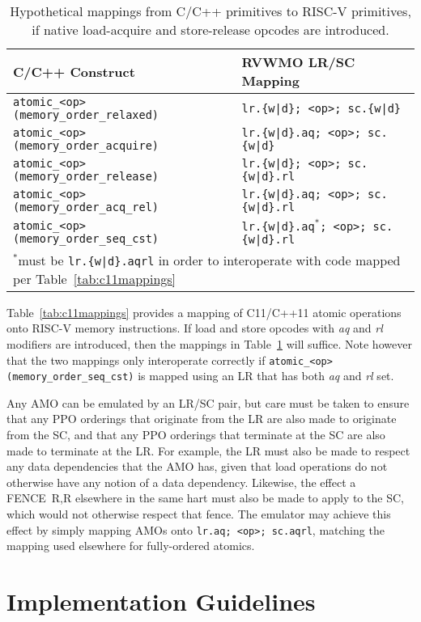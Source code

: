 \begin{table}[h!]
\begin{tabular}{|l|l|}
    \hline
    C/C++ Construct                           & RVWMO LR/SC Mapping\\
    \hline
    \tt atomic\_<op>(memory\_order\_relaxed)  & \tt lr.\{w|d\}; <op>; sc.\{w|d\} \\
    \hline
    \tt atomic\_<op>(memory\_order\_acquire)  & \tt lr.\{w|d\}.aq; <op>; sc.\{w|d\} \\
    \hline
    \tt atomic\_<op>(memory\_order\_release)  & \tt lr.\{w|d\}; <op>; sc.\{w|d\}.rl \\
    \hline
    \tt atomic\_<op>(memory\_order\_acq\_rel) & \tt lr.\{w|d\}.aq; <op>; sc.\{w|d\}.rl \\
    \hline
    \tt atomic\_<op>(memory\_order\_seq\_cst) & \tt lr.\{w|d\}.aq$^*$; <op>; sc.\{w|d\}.rl \\
    \hline
    \multicolumn{2}{l}{$^*$must be {\tt lr.\{w|d\}.aqrl} in order to interoperate with code mapped per Table~\ref{tab:c11mappings}}
  \end{tabular}
  \caption{Hypothetical mappings from C/C++ primitives to RISC-V primitives, if native load-acquire and store-release opcodes are introduced.}
  \label{tab:c11mappings_hypothetical}
\end{table}

Table~\ref{tab:c11mappings} provides a mapping of C11/C++11 atomic operations onto RISC-V memory instructions.
If load and store opcodes with {\em aq} and {\em rl} modifiers are introduced, then the mappings in Table~\ref{tab:c11mappings_hypothetical} will suffice.
Note however that the two mappings only interoperate correctly if {\tt atomic\_<op>(memory\_order\_seq\_cst)} is mapped using an LR that has both {\em aq} and {\em rl} set.

Any AMO can be emulated by an LR/SC pair, but care must be taken to ensure that any PPO orderings that originate from the LR are also made to originate from the SC, and that any PPO orderings that terminate at the SC are also made to terminate at the LR.
For example, the LR must also be made to respect any data dependencies that the AMO has, given that load operations do not otherwise have any notion of a data dependency.
Likewise, the effect a FENCE~R,R elsewhere in the same hart must also be made to apply to the SC, which would not otherwise respect that fence.
The emulator may achieve this effect by simply mapping AMOs onto {\tt lr.aq;~<op>;~sc.aqrl}, matching the mapping used elsewhere for fully-ordered atomics.

\section{Implementation Guidelines}

